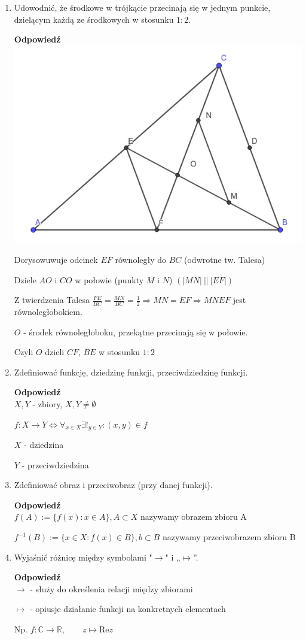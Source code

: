 \documentclass[12pt,a4paper]{article}
\theoremstyle{break}
\newcommand{\Odp}[1]{
		\begin{mdframed}[style=zadanie]
			\textbf{Odpowiedź}\\
			#1
		\end{mdframed}
	}
\begin{document}
\begin{enumerate}[1.]
	\item Udowodnić, że środkowe w trójkącie przecinają się w jednym punkcie, dzielącym każdą	ze środkowych w stosunku $1:2$.
	\Odp{
		\includegraphics[width=0.6\linewidth]{trj_proof_8.jpeg}
		
		Dorysowuwuje odcinek $EF$ równoległy do $BC$ (odwrotne tw. Talesa)
		
		Dziele $AO$ i $CO$ w połowie (punkty $M$ i $N$) $(|MN|\: ||\: |EF|)$
		
		Z twierdzenia Talesa $\frac{FE}{BC}=\frac{MN}{BC}=\frac{1}{2} \Rightarrow MN=EF \Rightarrow MNEF$ jest równoległobokiem.
		
		$O$ - środek równoległoboku, przekątne przecinają się w połowie.
		
		Czyli $O$ dzieli $CF$, $BE$ w stosunku $1:2$ 
	}
	
	\item Zdefiniować funkcję, dziedzinę funkcji, przeciwdziedzinę funkcji.
	\Odp{
		$X,Y$ - zbiory, $X,Y\neq \emptyset$
		
		$f:X\rightarrow Y \Leftrightarrow \forall_{x\in X} \exists!_{y\in Y}: (x,y)\in f$
		
		$X$ - dziedzina
		
		$Y$ - przeciwdziedzina
	}
	
	\item Zdefiniować obraz i przeciwobraz (przy danej funkcji).
	\Odp{
		$f(A):= \{f(x):x\in A\}, A\subset X$ nazywamy obrazem zbioru A
		
		$f^{-1}(B):= \{x\in X: f(x)\in B\}, b\subset B$ nazywamy przeciwobrazem zbioru B 
	}
	
	\item Wyjaśnić różnicę między symbolami "$\longrightarrow$" i „$\longmapsto$”.
	\Odp{
		$\longrightarrow$ - służy do określenia relacji między zbiorami
		
		$\longmapsto$ - opiusje działanie funkcji na konkretnych elementach
		
		Np. $f:\mathbb{C} \longrightarrow \mathbb{R}, \qquad z\longmapsto \text{Re}z$
	}
	

\end{enumerate}
\end{document}
